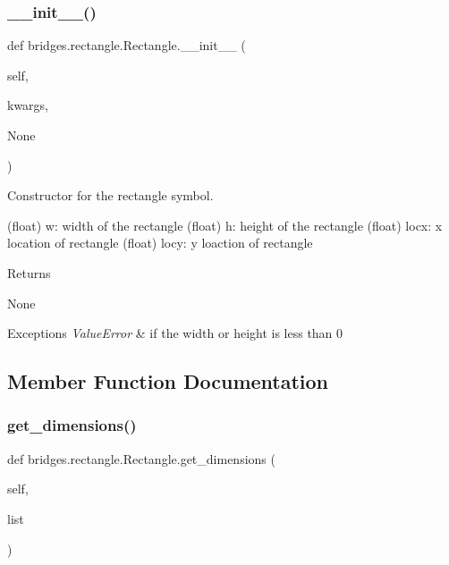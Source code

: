 \subsubsection{\texorpdfstring{\+\_\+\+\_\+init\+\_\+\+\_\+()}{\_\_init\_\_()}}
{\footnotesize\ttfamily def bridges.\+rectangle.\+Rectangle.\+\_\+\+\_\+init\+\_\+\+\_\+ (\begin{DoxyParamCaption}\item[{}]{self,  }\item[{}]{kwargs,  }\item[{}]{None }\end{DoxyParamCaption})}



Constructor for the rectangle symbol. 

(float) w\+: width of the rectangle (float) h\+: height of the rectangle (float) locx\+: x location of rectangle (float) locy\+: y loaction of rectangle \begin{DoxyReturn}{Returns}


None
\end{DoxyReturn}

\begin{DoxyExceptions}{Exceptions}
{\em Value\+Error} & if the width or height is less than 0 \\
\hline
\end{DoxyExceptions}


\subsection{Member Function Documentation}
\mbox{\label{classbridges_1_1rectangle_1_1_rectangle_a3f3823c7058ee639a92494276c2c9f22}} 
\subsubsection{\texorpdfstring{get\+\_\+dimensions()}{get\_dimensions()}}
{\footnotesize\ttfamily def bridges.\+rectangle.\+Rectangle.\+get\+\_\+dimensions (\begin{DoxyParamCaption}\item[{}]{self,  }\item[{}]{list }\end{DoxyParamCaption})}



